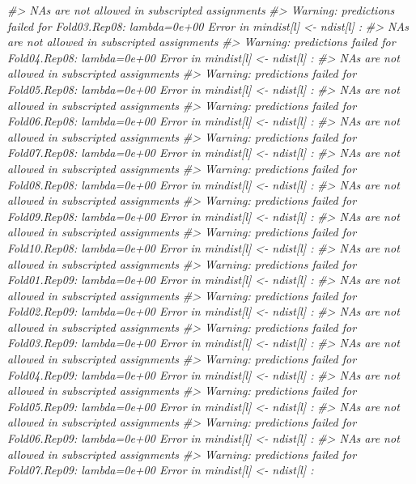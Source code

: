 \documentclass[]{book}
\newenvironment{Shaded}{\begin{snugshade}}{\end{snugshade}}
\newcommand{\CommentTok}[1]{\textcolor[rgb]{0.56,0.35,0.01}{\textit{#1}}}
\begin{document}
\begin{Shaded}
\begin{Highlighting}[]
\CommentTok{#>   NAs are not allowed in subscripted assignments}
\CommentTok{#> Warning: predictions failed for Fold03.Rep08: lambda=0e+00 Error in mindist[l] <- ndist[l] : }
\CommentTok{#>   NAs are not allowed in subscripted assignments}
\CommentTok{#> Warning: predictions failed for Fold04.Rep08: lambda=0e+00 Error in mindist[l] <- ndist[l] : }
\CommentTok{#>   NAs are not allowed in subscripted assignments}
\CommentTok{#> Warning: predictions failed for Fold05.Rep08: lambda=0e+00 Error in mindist[l] <- ndist[l] : }
\CommentTok{#>   NAs are not allowed in subscripted assignments}
\CommentTok{#> Warning: predictions failed for Fold06.Rep08: lambda=0e+00 Error in mindist[l] <- ndist[l] : }
\CommentTok{#>   NAs are not allowed in subscripted assignments}
\CommentTok{#> Warning: predictions failed for Fold07.Rep08: lambda=0e+00 Error in mindist[l] <- ndist[l] : }
\CommentTok{#>   NAs are not allowed in subscripted assignments}
\CommentTok{#> Warning: predictions failed for Fold08.Rep08: lambda=0e+00 Error in mindist[l] <- ndist[l] : }
\CommentTok{#>   NAs are not allowed in subscripted assignments}
\CommentTok{#> Warning: predictions failed for Fold09.Rep08: lambda=0e+00 Error in mindist[l] <- ndist[l] : }
\CommentTok{#>   NAs are not allowed in subscripted assignments}
\CommentTok{#> Warning: predictions failed for Fold10.Rep08: lambda=0e+00 Error in mindist[l] <- ndist[l] : }
\CommentTok{#>   NAs are not allowed in subscripted assignments}
\CommentTok{#> Warning: predictions failed for Fold01.Rep09: lambda=0e+00 Error in mindist[l] <- ndist[l] : }
\CommentTok{#>   NAs are not allowed in subscripted assignments}
\CommentTok{#> Warning: predictions failed for Fold02.Rep09: lambda=0e+00 Error in mindist[l] <- ndist[l] : }
\CommentTok{#>   NAs are not allowed in subscripted assignments}
\CommentTok{#> Warning: predictions failed for Fold03.Rep09: lambda=0e+00 Error in mindist[l] <- ndist[l] : }
\CommentTok{#>   NAs are not allowed in subscripted assignments}
\CommentTok{#> Warning: predictions failed for Fold04.Rep09: lambda=0e+00 Error in mindist[l] <- ndist[l] : }
\CommentTok{#>   NAs are not allowed in subscripted assignments}
\CommentTok{#> Warning: predictions failed for Fold05.Rep09: lambda=0e+00 Error in mindist[l] <- ndist[l] : }
\CommentTok{#>   NAs are not allowed in subscripted assignments}
\CommentTok{#> Warning: predictions failed for Fold06.Rep09: lambda=0e+00 Error in mindist[l] <- ndist[l] : }
\CommentTok{#>   NAs are not allowed in subscripted assignments}
\CommentTok{#> Warning: predictions failed for Fold07.Rep09: lambda=0e+00 Error in mindist[l] <- ndist[l] : }

\end{Highlighting}
\end{Shaded}
\end{document}
